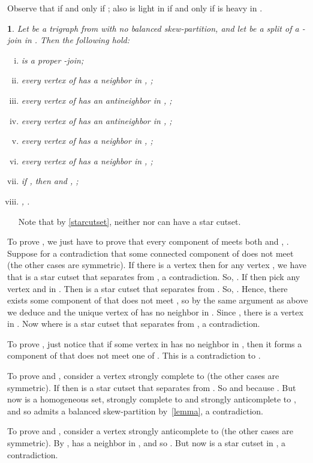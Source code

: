 \documentclass[11 pt] {article}
\newtheorem{theorem}{}[section]
\newcounter{claim}
\newcommand{\Proof}{\setcounter{claim}{0}\noindent{\bf Proof.}\ \ }
\begin{document}
Observe that  if and only if ; also  is light in  if and only if  is heavy in
. 



\begin{theorem}\label{2joinform}
  Let  be a trigraph from  with no balanced
  skew-partition, and let  be a split of a
  -join  in . Then the following hold:
 \begin{enumerate}[(i)]
 \item  is a proper -join;
 \item every vertex of  has a neighbor in , ;
 \item every vertex of  has an antineighbor in , ;
 \item every vertex of  has an antineighbor in , ;
 \item every vertex of  has a neighbor in ,
  ;
 \item every vertex of  has a neighbor in ,
  ;
\item if , then  and ,
  ;
\item \label{size}, .
 \end{enumerate}
\end{theorem}

\Proof 
Note that by \ref{starcutset}, neither  nor  can have
a star cutset.  

To prove , we just have to prove that every component of 
meets both  and , . Suppose for a contradiction that
some connected component  of  does not meet  (the other
cases are symmetric). If there is a vertex  then
for any vertex , we have that  is a star
cutset that separates  from , a contradiction.  So,
. If  then pick any vertex  and
 in . Then  is a star cutset that
separates  from . So, . Hence, there exists some
component of  that does not meet , so by the same argument
as above we deduce  and the unique vertex of  has no
neighbor in . Since , there is a vertex  in
. Now  where  is a star cutset that
separates  from , a contradiction.


To prove , just notice that if some vertex in  has no
neighbor in , then it forms a component of  that does not
meet one of . This is a contradiction to .

To prove  and , consider a vertex  strongly
complete to  (the other cases are symmetric). If  then  is a star cutset that
separates  from . So  and  because .  But now  is
a homogeneous set, strongly complete to  and strongly
anticomplete to , and so  admits a balanced skew-partition
by~\ref{lemma}, a contradiction.

To prove  and , consider a vertex  strongly
anticomplete to  (the other cases are symmetric). By
,  has a neighbor in , and so . But now
 is a star cutset in
, a contradiction.
\end{document}
